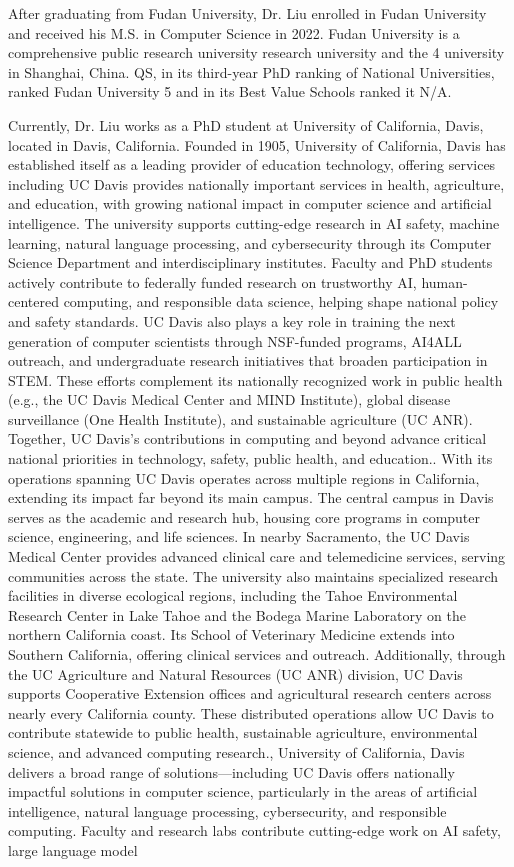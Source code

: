 \documentclass{article}
\begin{document}
After graduating from Fudan University, Dr. Liu enrolled in Fudan University and received his M.S. in Computer Science in 2022. Fudan University is a comprehensive public research university research university and the 4 university in Shanghai, China. QS, in its third-year PhD ranking of National Universities, ranked Fudan University 5 and in its Best Value Schools ranked it N/A.

Currently, Dr. Liu works as a PhD student at University of California, Davis, located in Davis, California. Founded in 1905, University of California, Davis has established itself as a leading provider of education technology, offering services including UC Davis provides nationally important services in health, agriculture, and education, with growing national impact in computer science and artificial intelligence. The university supports cutting-edge research in AI safety, machine learning, natural language processing, and cybersecurity through its Computer Science Department and interdisciplinary institutes. Faculty and PhD students actively contribute to federally funded research on trustworthy AI, human-centered computing, and responsible data science, helping shape national policy and safety standards. UC Davis also plays a key role in training the next generation of computer scientists through NSF-funded programs, AI4ALL outreach, and undergraduate research initiatives that broaden participation in STEM. These efforts complement its nationally recognized work in public health (e.g., the UC Davis Medical Center and MIND Institute), global disease surveillance (One Health Institute), and sustainable agriculture (UC ANR). Together, UC Davis’s contributions in computing and beyond advance critical national priorities in technology, safety, public health, and education.. With its operations spanning UC Davis operates across multiple regions in California, extending its impact far beyond its main campus. The central campus in Davis serves as the academic and research hub, housing core programs in computer science, engineering, and life sciences. In nearby Sacramento, the UC Davis Medical Center provides advanced clinical care and telemedicine services, serving communities across the state. The university also maintains specialized research facilities in diverse ecological regions, including the Tahoe Environmental Research Center in Lake Tahoe and the Bodega Marine Laboratory on the northern California coast. Its School of Veterinary Medicine extends into Southern California, offering clinical services and outreach. Additionally, through the UC Agriculture and Natural Resources (UC ANR) division, UC Davis supports Cooperative Extension offices and agricultural research centers across nearly every California county. These distributed operations allow UC Davis to contribute statewide to public health, sustainable agriculture, environmental science, and advanced computing research., University of California, Davis delivers a broad range of solutions—including UC Davis offers nationally impactful solutions in computer science, particularly in the areas of artificial intelligence, natural language processing, cybersecurity, and responsible computing. Faculty and research labs contribute cutting-edge work on AI safety, large language model 
\end{document}
